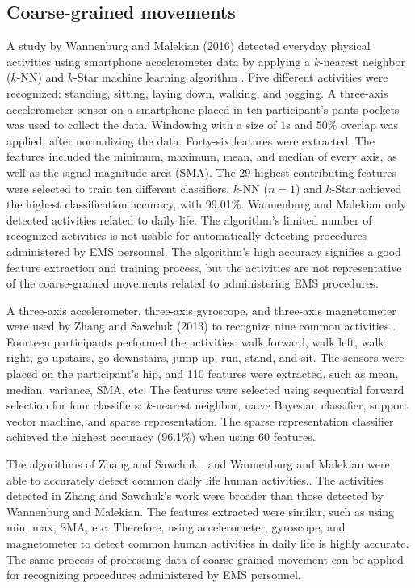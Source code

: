 \subsection{Coarse-grained movements}
A study by Wannenburg and Malekian (2016) detected everyday physical activities using smartphone accelerometer data by applying a $k$-nearest neighbor ($k$-NN) and $k$-Star machine learning algorithm \cite{Wannenburg2016}. Five different activities were recognized: standing, sitting, laying down, walking, and jogging. A three-axis accelerometer sensor on a smartphone placed in ten participant's pants pockets was used to collect the data. Windowing with a size of 1s and 50\% overlap was applied, after normalizing the data. Forty-six features were extracted. The features included the minimum, maximum, mean, and median of every axis, as well as the signal magnitude area (\gls{SMA}). The 29 highest contributing features were selected to train ten different classifiers. $k$-NN ($n = 1$) and $k$-Star achieved the highest classification accuracy, with 99.01\%. Wannenburg and Malekian only detected activities related to daily life. The algorithm's limited number of recognized activities is not usable for automatically detecting procedures administered by EMS personnel. The algorithm's high accuracy signifies a good feature extraction and training process, but the activities are not representative of the coarse-grained movements related to administering EMS procedures.
\par A three-axis accelerometer, three-axis gyroscope, and three-axis magnetometer were used by Zhang and Sawchuk (2013) to recognize nine common activities \cite{Zhang2013}. Fourteen participants performed the activities: walk forward, walk left, walk right, go upstairs, go downstairs, jump up, run, stand, and sit. The sensors were placed on the participant's hip, and 110 features were extracted, such as mean, median, variance, SMA, etc. The features were selected using sequential forward selection for four classifiers: $k$-nearest neighbor, naive Bayesian classifier, support vector machine, and sparse representation. The sparse representation classifier achieved the highest accuracy (96.1\%) when using 60 features.
\par The algorithms of Zhang and Sawchuk \cite{Zhang2013}, and Wannenburg and Malekian \cite{Wannenburg2016} were able to accurately detect common daily life human activities.. The activities detected in Zhang and Sawchuk's work were broader than those detected by Wannenburg and Malekian. The features extracted were similar, such as using min, max, SMA, etc. Therefore, using accelerometer, gyroscope, and magnetometer to detect common human activities in daily life is highly accurate. The same process of processing data of coarse-grained movement can be applied for recognizing procedures administered by EMS personnel.
